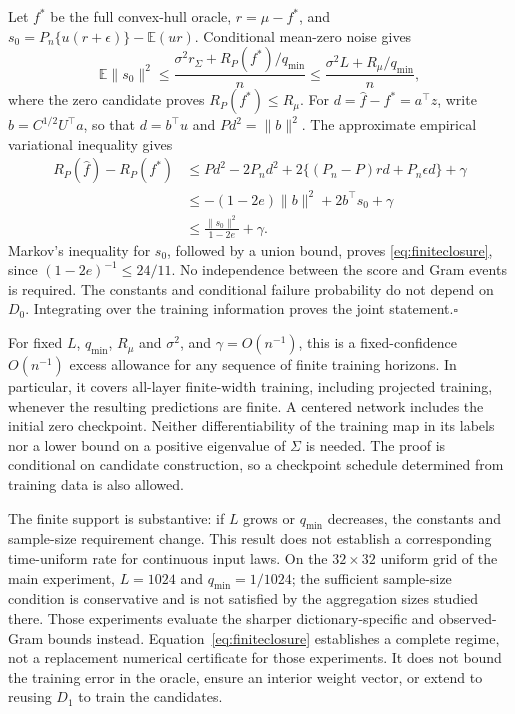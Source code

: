 \documentclass[pdflatex,sn-mathphys-ay]{sn-jnl}
\theoremstyle{remark}\newtheorem{remark}[theorem]{Remark}
\newcommand{\E}{\mathbb E}
\begin{document}
Let $f^*$ be the full convex-hull oracle, $r=\mu-f^*$, and
$s_0=P_n\{u(r+\epsilon)\}-\E(ur)$. Conditional mean-zero noise gives
\[
 \E\|s_0\|^2\leq\frac{\sigma^2r_\Sigma+R_P(f^*)/q_{\min}}{n}
 \leq\frac{\sigma^2L+R_\mu/q_{\min}}{n},
\]
where the zero candidate proves $R_P(f^*)\leq R_\mu$.
For $d=\hat f-f^*=a^\top z$, write $b=C^{1/2}U^\top a$, so that $d=b^\top u$ and $Pd^2=\|b\|^2$. The approximate empirical variational inequality gives
\begin{align*}
 R_P(\hat f)-R_P(f^*)&\leq Pd^2-2P_nd^2
   +2\{(P_n-P)rd+P_n\epsilon d\}+\gamma\\
 &\leq-(1-2e)\|b\|^2+2b^\top s_0+\gamma\\
 &\leq\frac{\|s_0\|^2}{1-2e}+\gamma.
\end{align*}
Markov's inequality for $s_0$, followed by a union bound, proves \eqref{eq:finiteclosure}, since $(1-2e)^{-1}\leq24/11$. No independence between the score and Gram events is required. The constants and conditional failure probability do not depend on $D_0$. Integrating over the training information proves the joint statement.\hfill$\square$

For fixed $L$, $q_{\min}$, $R_\mu$ and $\sigma^2$, and $\gamma=O(n^{-1})$, this is a fixed-confidence $O(n^{-1})$ excess allowance for any sequence of finite training horizons. In particular, it covers all-layer finite-width training, including projected training, whenever the resulting predictions are finite. A centered network includes the initial zero checkpoint. Neither differentiability of the training map in its labels nor a lower bound on a positive eigenvalue of $\Sigma$ is needed. The proof is conditional on candidate construction, so a checkpoint schedule determined from training data is also allowed.

The finite support is substantive: if $L$ grows or $q_{\min}$ decreases, the constants and sample-size requirement change. This result does not establish a corresponding time-uniform rate for continuous input laws. On the $32\times32$ uniform grid of the main experiment, $L=1024$ and $q_{\min}=1/1024$; the sufficient sample-size condition is conservative and is not satisfied by the aggregation sizes studied there. Those experiments evaluate the sharper dictionary-specific and observed-Gram bounds instead. Equation~\eqref{eq:finiteclosure} establishes a complete regime, not a replacement numerical certificate for those experiments. It does not bound the training error in the oracle, ensure an interior weight vector, or extend to reusing $D_1$ to train the candidates.
\end{document}
